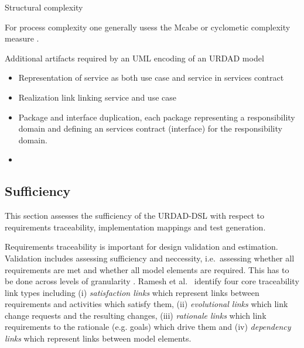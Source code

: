 Structural complexity

For process complexity one generally usess the Mcabe or cyclometic complexity measure \cite{mccabe_complexity_1976}.

Additional artifacts required by an UML encoding of an URDAD model
\begin{itemize}
  \item Representation of service as both use case and service in services contract
  \item Realization link linking service and use case
  \item Package and interface duplication, each package representing a responsibility domain and defining an services contract (interface) for the responsibility domain.
  \item
\end{itemize}



\subsection{Sufficiency}

This section assesses the sufficiency of the URDAD-DSL with respect to requirements traceability, implementation mappings and test generation. 

Requirements traceability is important for design validation and estimation. Validation includes assessing sufficiency and neccessity, i.e.\ assessing whether all requirements are met and whether all model elements are required. This has to be done across levels of granularity \cite{dick_design_2005}. Ramesh et al.\ \cite{ramesh_toward_2001} identify four core traceability link types including (i) \emph{satisfaction links} which represent links between requirements and activities which satisfy them, (ii) \emph{evolutional links} which link change requests and the resulting changes, (iii) \emph{rationale links} which link requirements to the rationale (e.g. goals) which drive them and (iv) \emph{dependency links} which represent links between model elements.

